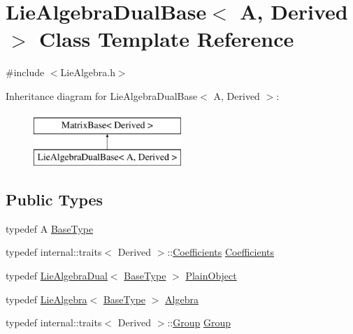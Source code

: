 \hypertarget{class_lie_algebra_dual_base}{}\section{Lie\+Algebra\+Dual\+Base$<$ A, Derived $>$ Class Template Reference}
\label{class_lie_algebra_dual_base}


{\ttfamily \#include $<$Lie\+Algebra.\+h$>$}

Inheritance diagram for Lie\+Algebra\+Dual\+Base$<$ A, Derived $>$\+:\begin{figure}[H]
\begin{center}
\leavevmode
\includegraphics[height=2.000000cm]{class_lie_algebra_dual_base}
\end{center}
\end{figure}
\subsection*{Public Types}
\begin{DoxyCompactItemize}
\item 
typedef A \hyperlink{class_lie_algebra_dual_base_a1d0d10f7479bc0e235b13e29f1c012d2}{Base\+Type}
\item 
typedef internal\+::traits$<$ Derived $>$\+::\hyperlink{class_lie_algebra_dual_base_a9cbdf57fdc61d9ff457e9a9a814f5fdd}{Coefficients} \hyperlink{class_lie_algebra_dual_base_a9cbdf57fdc61d9ff457e9a9a814f5fdd}{Coefficients}
\item 
typedef \hyperlink{class_lie_algebra_dual}{Lie\+Algebra\+Dual}$<$ \hyperlink{class_lie_algebra_dual_base_a1d0d10f7479bc0e235b13e29f1c012d2}{Base\+Type} $>$ \hyperlink{class_lie_algebra_dual_base_a9b59cead2f78ed837cd22a96155e5da3}{Plain\+Object}
\item 
typedef \hyperlink{class_lie_algebra}{Lie\+Algebra}$<$ \hyperlink{class_lie_algebra_dual_base_a1d0d10f7479bc0e235b13e29f1c012d2}{Base\+Type} $>$ \hyperlink{class_lie_algebra_dual_base_a50d4fa9e6b80c63c7ec5955717133db3}{Algebra}
\item 
typedef internal\+::traits$<$ Derived $>$\+::\hyperlink{class_lie_algebra_dual_base_a540618e11addb56f20f6d007204c107c}{Group} \hyperlink{class_lie_algebra_dual_base_a540618e11addb56f20f6d007204c107c}{Group}
\end{DoxyCompactItemize}
